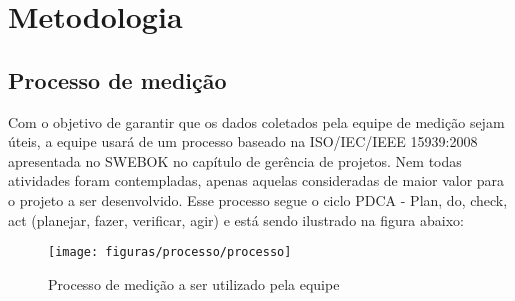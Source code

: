 \chapter{Metodologia}

\section{Processo de medição}

Com o objetivo de garantir que os dados coletados pela equipe de medição sejam úteis, a equipe usará de um processo baseado na ISO/IEC/IEEE 15939:2008 apresentada no SWEBOK no capítulo de gerência de projetos. Nem todas atividades foram contempladas, apenas aquelas consideradas de maior valor para o projeto a ser desenvolvido. Esse processo segue o ciclo PDCA - Plan, do, check, act (planejar, fazer, verificar, agir) e está sendo ilustrado na figura abaixo:

\begin{figure}[!htpb]
\centering
\texttt{[image: figuras/processo/processo]}
\caption{Processo de medição a ser utilizado pela equipe}
\end{figure}